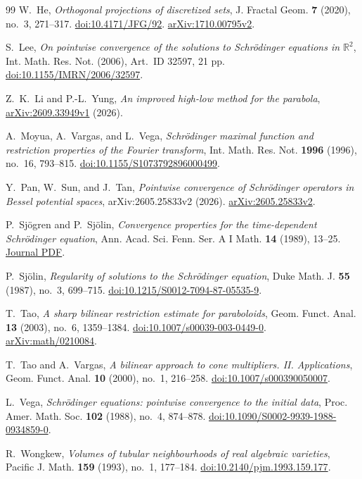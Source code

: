 \begin{thebibliography}{99}
W.~He,
\emph{Orthogonal projections of discretized sets},
J. Fractal Geom. \textbf{7} (2020), no.~3, 271--317.
\href{https://doi.org/10.4171/JFG/92}{doi:10.4171/JFG/92}.
\href{https://arxiv.org/abs/1710.00795v2}{arXiv:1710.00795v2}.

S.~Lee,
\emph{On pointwise convergence of the solutions to Schr\"odinger equations
in $\mathbb R^2$},
Int. Math. Res. Not. (2006), Art.~ID 32597, 21 pp.
\href{https://doi.org/10.1155/IMRN/2006/32597}{doi:10.1155/IMRN/2006/32597}.

Z.~K.~Li and P.-L.~Yung,
\emph{An improved high-low method for the parabola},\newline
\href{https://arxiv.org/abs/2609.33949v1}{arXiv:2609.33949v1} (2026).

A.~Moyua, A.~Vargas, and L.~Vega,
\emph{Schr\"odinger maximal function and restriction properties of the
Fourier transform},
Int. Math. Res. Not. \textbf{1996} (1996), no.~16, 793--815.
\href{https://doi.org/10.1155/S1073792896000499}{doi:10.1155/S1073792896000499}.

Y.~Pan, W.~Sun, and J.~Tan,
\emph{Pointwise convergence of Schr\"odinger operators in Bessel potential
spaces},
arXiv:2605.25833v2 (2026).
\href{https://arxiv.org/abs/2605.25833v2}{arXiv:2605.25833v2}.

P.~Sj\"ogren and P.~Sj\"olin,
\emph{Convergence properties for the time-dependent Schr\"odinger equation},
Ann. Acad. Sci. Fenn. Ser. A I Math. \textbf{14} (1989), 13--25.
\href{https://www.acadsci.fi/mathematica/Vol14/vol14pp013-025.pdf}{Journal PDF}.

P.~Sj\"olin,
\emph{Regularity of solutions to the Schr\"odinger equation},
Duke Math. J. \textbf{55} (1987), no.~3, 699--715.
\href{https://doi.org/10.1215/S0012-7094-87-05535-9}{doi:10.1215/S0012-7094-87-05535-9}.

T.~Tao,
\emph{A sharp bilinear restriction estimate for paraboloids},
Geom. Funct. Anal. \textbf{13} (2003), no.~6, 1359--1384.
\href{https://doi.org/10.1007/s00039-003-0449-0}{doi:10.1007/s00039-003-0449-0}.
\href{https://arxiv.org/abs/math/0210084}{arXiv:math/0210084}.

T.~Tao and A.~Vargas,
\emph{A bilinear approach to cone multipliers. II. Applications},
Geom. Funct. Anal. \textbf{10} (2000), no.~1, 216--258.
\href{https://doi.org/10.1007/s000390050007}{doi:10.1007/s000390050007}.

L.~Vega,
\emph{Schr\"odinger equations: pointwise convergence to the initial data},
Proc. Amer. Math. Soc. \textbf{102} (1988), no.~4, 874--878.
\href{https://doi.org/10.1090/S0002-9939-1988-0934859-0}{doi:10.1090/S0002-9939-1988-0934859-0}.

R.~Wongkew,
\emph{Volumes of tubular neighbourhoods of real algebraic varieties},
Pacific J. Math. \textbf{159} (1993), no.~1, 177--184.
\href{https://doi.org/10.2140/pjm.1993.159.177}{doi:10.2140/pjm.1993.159.177}.

\end{thebibliography}
